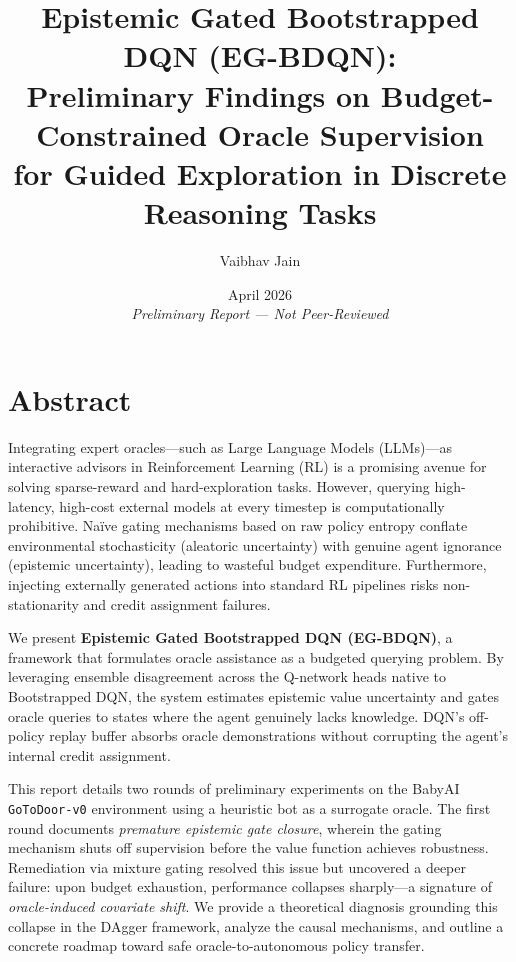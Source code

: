 \documentclass[11pt, a4paper]{article}
\title{%
    \textbf{Epistemic Gated Bootstrapped DQN (EG-BDQN):} \\[0.3em]
    \large Preliminary Findings on Budget-Constrained Oracle Supervision \\
    for Guided Exploration in Discrete Reasoning Tasks%
}
\author{Vaibhav Jain}
\affil{vaja00001@uni-saarland.de}
\date{April 2026 \\ {\small \textit{Preliminary Report --- Not Peer-Reviewed}}}
\begin{document}
\linenumbers
\maketitle

\section{Abstract}

Integrating expert oracles---such as Large Language Models (LLMs)---as interactive advisors in Reinforcement Learning (RL) is a promising avenue for solving sparse-reward and hard-exploration tasks. However, querying high-latency, high-cost external models at every timestep is computationally prohibitive. Na\"ive gating mechanisms based on raw policy entropy conflate environmental stochasticity (aleatoric uncertainty) with genuine agent ignorance (epistemic uncertainty), leading to wasteful budget expenditure. Furthermore, injecting externally generated actions into standard RL pipelines risks non-stationarity and credit assignment failures.

We present \textbf{Epistemic Gated Bootstrapped DQN (EG-BDQN)}, a framework that formulates oracle assistance as a budgeted querying problem. By leveraging ensemble disagreement across the Q-network heads native to Bootstrapped DQN, the system estimates epistemic value uncertainty and gates oracle queries to states where the agent genuinely lacks knowledge. DQN's off-policy replay buffer absorbs oracle demonstrations without corrupting the agent's internal credit assignment.

This report details two rounds of preliminary experiments on the BabyAI \texttt{GoToDoor-v0} environment using a heuristic bot as a surrogate oracle. The first round documents \textit{premature epistemic gate closure}, wherein the gating mechanism shuts off supervision before the value function achieves robustness. Remediation via mixture gating resolved this issue but uncovered a deeper failure: upon budget exhaustion, performance collapses sharply---a signature of \textit{oracle-induced covariate shift}. We provide a theoretical diagnosis grounding this collapse in the DAgger framework, analyze the causal mechanisms, and outline a concrete roadmap toward safe oracle-to-autonomous policy transfer.


\end{document}

